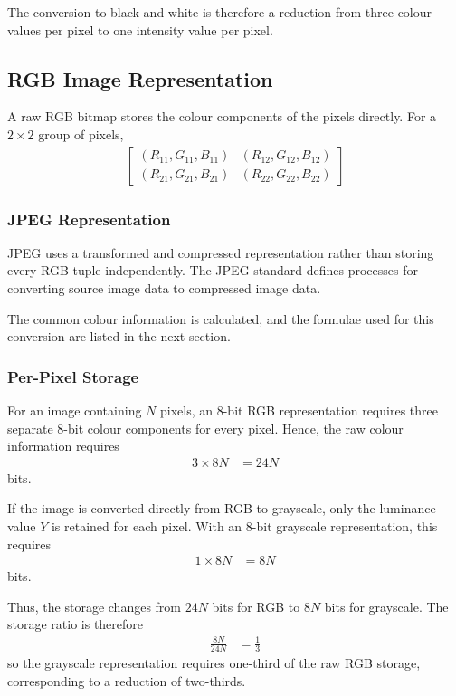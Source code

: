 The conversion to black and white is therefore a reduction from three
colour values per pixel to one intensity value per pixel.

\subsection{RGB Image Representation}

A raw RGB bitmap stores the colour components of the pixels directly.
For a $2\times2$ group of pixels,
\begin{align}
\begin{bmatrix}
(R_{11},G_{11},B_{11}) & (R_{12},G_{12},B_{12})\\
(R_{21},G_{21},B_{21}) & (R_{22},G_{22},B_{22})
\end{bmatrix}\label{eq:app_raw_rgb_2x2}
\end{align}

\subsubsection{JPEG Representation}

JPEG uses a transformed and compressed representation rather than
storing every RGB tuple independently. The JPEG standard defines processes
for converting source image data to compressed image data.

The common colour information is calculated, and the formulae used for
this conversion are listed in the next section.

\subsubsection{Per-Pixel Storage}

For an image containing $N$ pixels, an 8-bit RGB representation requires
three separate 8-bit colour components for every pixel. Hence, the raw
colour information requires
\begin{align}
3\times8N&=24N\label{eq:app_rgb_storage_bits}
\end{align}
bits.

If the image is converted directly from RGB to grayscale, only the
luminance value $Y$ is retained for each pixel. With an 8-bit grayscale
representation, this requires
\begin{align}
1\times8N&=8N\label{eq:app_grayscale_storage_bits}
\end{align}
bits.

Thus, the storage changes from $24N$ bits for RGB to $8N$ bits for
grayscale. The storage ratio is therefore
\begin{align}
\frac{8N}{24N}&=\frac{1}{3}\label{eq:app_rgb_grayscale_ratio}
\end{align}
so the grayscale representation requires one-third of the raw RGB
storage, corresponding to a reduction of two-thirds.

